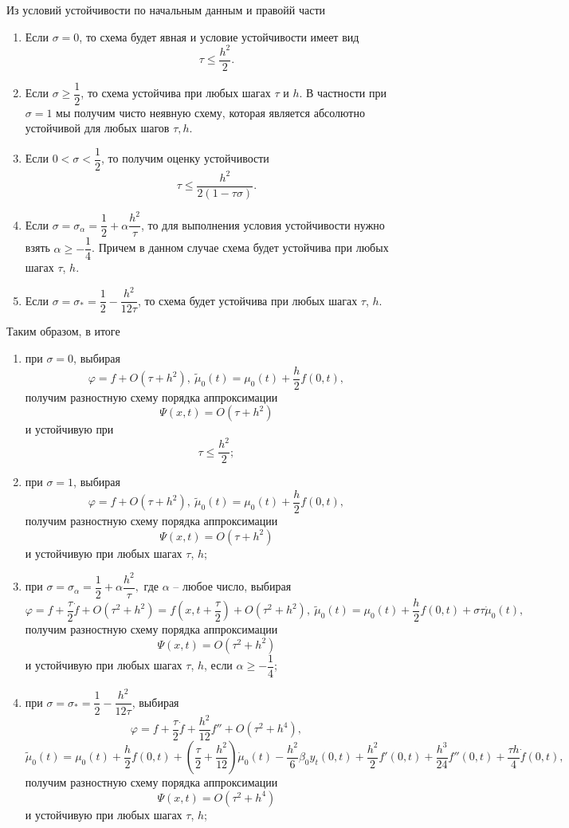 \documentclass[a4paper, 12pt]{article}
\begin{document}
    Из условий устойчивости по начальным данным и правойй части
    \begin{enumerate}
    	\item Если $\sigma = 0$, то схема будет явная и условие устойчивости имеет вид
    	\begin{equation*}
    		\tau \leq \dfrac{h^2}{2}.
    	\end{equation*}
    	\item Если $\sigma \geq \dfrac 12$, то схема устойчива при любых шагах $\tau$ и $h$. В частности при $\sigma = 1$ мы получим чисто неявную схему, которая является абсолютно устойчивой для любых шагов $\tau, h$.
    	\item Если $ 0 < \sigma < \dfrac 12$, то получим оценку устойчивости
    	\begin{equation*}
    		\tau \leq \dfrac{h^2}{2(1-\tau\sigma)}.
    	\end{equation*}
    	\item Если $\sigma = \sigma_\alpha = \dfrac 12 + \alpha \dfrac {h^2}{\tau}$, то для выполнения условия устойчивости нужно взять $\alpha \geq -\dfrac 1 4$. Причем в данном случае схема будет устойчива при любых шагах $\tau$, $h$.
    	\item Если $\sigma = \sigma_* = \dfrac 12 - \dfrac{h^2}{12\tau}$, то схема будет устойчива при любых шагах $\tau$, $h$.
    \end{enumerate}
    Таким образом, в итоге 
    \begin{enumerate}
    	\item при $\sigma = 0$,
    	выбирая
    	$$\varphi = f + O(\tau + h^2),\ \tilde \mu_0(t) = \mu_0(t) + \dfrac h2 f(0,t),$$
    	получим разностную схему порядка аппроксимации
    	$$\Psi (x,t) = O(\tau + h^2)$$
    	и устойчивую при $$\tau \leq \dfrac{h^2}{2};$$
    	\item при $\sigma = 1$, выбирая 
    	$$\varphi = f + O(\tau + h^2),\ \tilde \mu_0(t) = \mu_0(t) + \dfrac h2 f(0,t),$$
    	получим разностную схему порядка аппроксимации
    	$$\Psi (x,t) = O(\tau + h^2)$$
    	и устойчивую при любых шагах $\tau$, $h$;
    	\item при $\sigma = \sigma_\alpha = \dfrac 12 + \alpha \dfrac{h^2}{\tau},$ где $\alpha$ -- любое число, выбирая
    	$$\varphi = f + \dfrac \tau 2 \dot f + O(\tau^2 + h^2) = f\left(x,t + \dfrac \tau 2\right) + O(\tau^2 + h^2),\ \tilde \mu_0(t) = \mu_0(t) + \dfrac h2 f(0,t) + \sigma \tau \dot \mu_0(t),$$ получим разностную схему порядка аппроксимации
    	$$\Psi (x,t) = O(\tau^2 + h^2)$$
    	и устойчивую при любых шагах $\tau$, $h$, если $\alpha\geq - \dfrac 14$;
    	\item при $\sigma = \sigma_* = \dfrac 12 - \dfrac {h^2}{12\tau}$, выбирая
    	$$\varphi = f + \dfrac \tau 2 \dot f + \dfrac{h^2}{12}f'' + O(\tau^2 + h^4), $$
    	$$\tilde \mu_0(t) = \mu_0(t) + \dfrac h2 f(0,t) + \left(\dfrac \tau 2 + \dfrac {h^2}{12}\right)\dot \mu_0(t) - \dfrac{h^2}{6}\beta_0 y_t(0,t) + \dfrac {h^2}{2}f'(0,t) + \dfrac{h^3}{24}f''(0,t) + \dfrac{\tau h}{4}\dot f(0,t),$$
    	получим разностную схему порядка аппроксимации
    	$$\Psi (x,t) = O(\tau^2 + h^4)$$
    	и устойчивую при любых шагах $\tau$, $h$;
    \end{enumerate}
\end{document}
